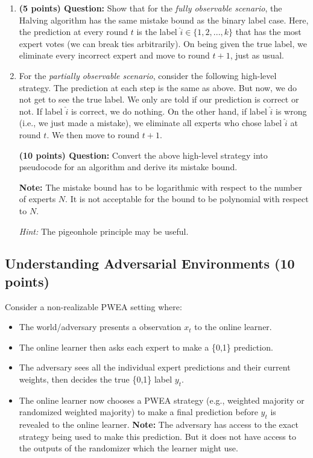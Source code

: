 \documentclass{article}
\begin{document}
\begin{enumerate}
    \item \textbf{(5 points) Question:} Show that for the \textit{fully observable scenario}, the Halving algorithm has the same mistake bound as the binary label case. Here, the prediction at every round $t$ is the label $\hat{i}\in \{1,2,...,k\}$ that has the most expert votes (we can break ties arbitrarily). On being given the true label, we eliminate every incorrect expert and move to round $t+1$, just as usual.
    
    \item For the \textit{partially observable scenario}, consider the following high-level strategy. The prediction at each step is the same as above. But now, we do not get to see the true label. We only are told if our prediction is correct or not. If label $\hat{i}$ is correct, we do nothing. On the other hand, if label $\hat{i}$ is wrong (i.e., we just made a mistake), we eliminate all experts who chose label $\hat{i}$ at round $t$. We then move to round $t+1$.

    \textbf{(10 points) Question:}
    Convert the above high-level strategy into pseudocode for an algorithm and derive its mistake bound. 
    
    \textbf{Note:} The mistake bound has to be logarithmic with respect to the number of experts $N$. It is not acceptable for the bound to be polynomial with respect to $N$.

    \emph{Hint:} The pigeonhole principle may be useful.
    
\end{enumerate}


\subsection{Understanding Adversarial Environments (10 points)}
Consider a non-realizable PWEA setting where:
\begin{itemize}
    \item The world/adversary presents a observation $x_t$ to the online learner.
    \item The online learner then asks each expert to make a \{0,1\} prediction. 
    \item The adversary sees all the individual expert predictions and their current weights, then decides the true \{0,1\} label $y_t$.
    \item The online learner now chooses a PWEA strategy (e.g., weighted majority or randomized weighted majority) to make a final prediction before $y_t$ is revealed to the online learner.
    \textbf{Note:} The adversary has access to the exact strategy being used to make this prediction. But it does not have access to the outputs of the randomizer which the learner might use.
\end{itemize}
\end{document}
